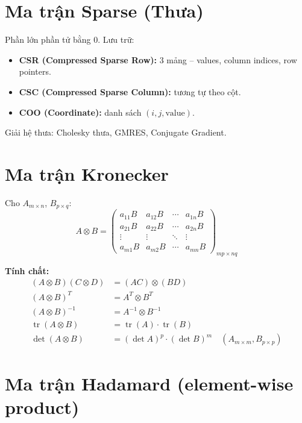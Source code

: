 \section{Ma trận Sparse (Thưa)}

Phần lớn phần tử bằng $0$. Lưu trữ:
\begin{itemize}
    \item \textbf{CSR (Compressed Sparse Row):} 3 mảng -- values, column indices, row pointers.
    \item \textbf{CSC (Compressed Sparse Column):} tương tự theo cột.
    \item \textbf{COO (Coordinate):} danh sách $(i, j, \text{value})$.
\end{itemize}

Giải hệ thưa: Cholesky thưa, GMRES, Conjugate Gradient.

\section{Ma trận Kronecker}

Cho $A_{m \times n}$, $B_{p \times q}$:
\[
A \otimes B = \begin{pmatrix}
a_{11}B & a_{12}B & \cdots & a_{1n}B \\
a_{21}B & a_{22}B & \cdots & a_{2n}B \\
\vdots & \vdots & \ddots & \vdots \\
a_{m1}B & a_{m2}B & \cdots & a_{mn}B
\end{pmatrix}_{mp \times nq}
\]

\textbf{Tính chất:}
\begin{align}
(A \otimes B)(C \otimes D) &= (AC) \otimes (BD) \\
(A \otimes B)^T &= A^T \otimes B^T \\
(A \otimes B)^{-1} &= A^{-1} \otimes B^{-1} \\
\operatorname{tr}(A \otimes B) &= \operatorname{tr}(A) \cdot \operatorname{tr}(B) \\
\det(A \otimes B) &= (\det A)^p \cdot (\det B)^m \quad (A_{m \times m}, B_{p \times p})
\end{align}

\section{Ma trận Hadamard (element-wise product)}

